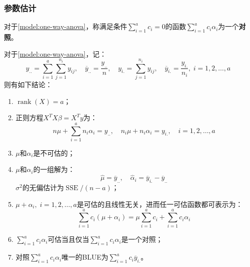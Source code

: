 \subsubsection{参数估计}
\begin{definition}
	对于\cref{model:one-way-anova}，称满足条件$\sum\limits_{i=1}^{a}c_i=0$的函数$\sum\limits_{i=1}^{a}c_i\alpha_i$为一个\textbf{对照}。
\end{definition}
\begin{theorem}\label{theo:one-way-anova-estimate}
	对于\cref{model:one-way-anova}，记：
	\begin{equation*}
		y_{..}=\sum_{i=1}^a\sum_{j=1}^{n_i}y_{ij},\quad\overline{y}_{..}=\frac{y_{..}}{n},\quad y_{i.}=\sum_{j=1}^{n_i}y_{ij},\quad \overline{y}_{i.}=\frac{y_{i.}}{n_i},\;i=1,2,\dots,a
	\end{equation*}
	则有如下结论：
	\begin{enumerate}
		\item $\operatorname{rank}(X)=a$；
		\item 正则方程$X^TX\beta=X^Ty$为：
		\begin{equation*}
			n\mu+\sum_{i=1}^{a}n_i\alpha_i=y_{..},\quad n_i\mu+n_i\alpha_i=y_{i.},\quad i=1,2,\dots,a
		\end{equation*}
		\item $\mu$和$\alpha_i$是不可估的；
		\item $\mu$和$\alpha_i$的一组解为：
		\begin{equation*}
			\hat{\mu}=\overline{y}_{..},\quad\hat{\alpha}_i=\overline{y}_{i.}-\overline{y}_{..}
		\end{equation*}
		$\sigma^2$的无偏估计为$\operatorname{SSE}/(n-a)$；
		\item $\mu+\alpha_i,\;i=1,2,\dots,a$是可估的且线性无关，进而任一可估函数都可表示为：
		\begin{equation*}
			\sum_{i=1}^{a}c_i(\mu+\alpha_i)=\mu\sum_{i=1}^{a}c_i+\sum_{i=1}^{a}c_i\alpha_i
		\end{equation*}
		\item $\sum\limits_{i=1}^{a}c_i\alpha_i$可估当且仅当$\sum\limits_{i=1}^{a}c_i\alpha_i$是一个对照；
		\item 对照$\sum\limits_{i=1}^{a}c_i\alpha_i$唯一的BLUE为$\sum\limits_{i=1}^{a}c_i\overline{y}_{i.}$。
	\end{enumerate}
\end{theorem}
